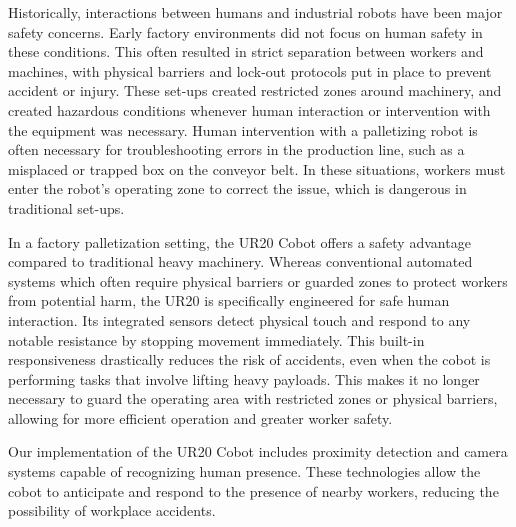 Historically, interactions between humans and industrial robots have been major safety concerns. Early factory environments did not focus on human safety in these conditions. This often resulted in strict separation between workers and machines, with physical barriers and lock-out protocols put in place to prevent accident or injury. These set-ups created restricted zones around machinery, and created hazardous conditions whenever human interaction or intervention with the equipment was necessary. Human intervention with a palletizing robot is often necessary for troubleshooting errors in the production line, such as a misplaced or trapped box on the conveyor belt. In these situations, workers must enter the robot’s operating zone to correct the issue, which is dangerous in traditional set-ups.

In a factory palletization setting, the UR20 Cobot offers a safety advantage compared to traditional heavy machinery. Whereas conventional automated systems which often require physical barriers or guarded zones to protect workers from potential harm, the UR20 is specifically engineered for safe human interaction. Its integrated sensors detect physical touch and respond to any notable resistance by stopping movement immediately. This built-in responsiveness drastically reduces the risk of accidents, even when the cobot is performing tasks that involve lifting heavy payloads. This makes it no longer necessary to guard the operating area with restricted zones or physical barriers, allowing for more efficient operation and greater worker safety.

Our implementation of the UR20 Cobot includes proximity detection and camera systems capable of recognizing human presence. These technologies allow the cobot to anticipate and respond to the presence of nearby workers, reducing the possibility of workplace accidents.

